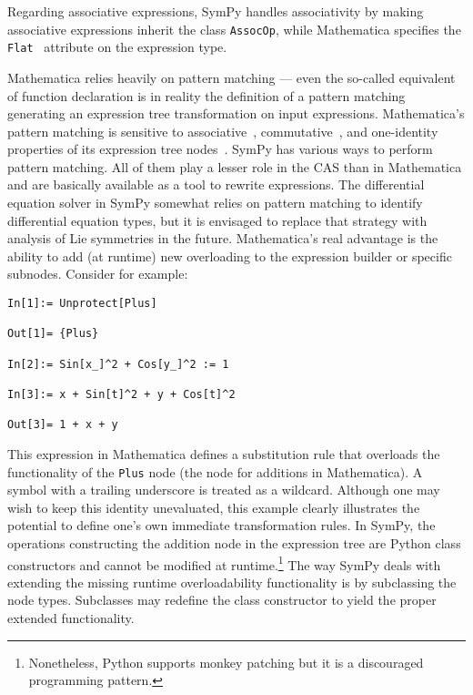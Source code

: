 
Regarding associative expressions,
SymPy handles associativity by making associative expressions inherit the
class \texttt{AssocOp},
while Mathematica specifies the \texttt{Flat}~\cite{WolframRefFlat} attribute on the expression type.




Mathematica relies heavily on pattern matching ---
even the so-called equivalent of function declaration is in reality
the definition of a pattern matching generating an expression tree transformation
on input expressions.
%
Mathematica's pattern matching is sensitive to
associative~\cite{WolframRefFlat}, commutative~\cite{WolframRefOrderless}, and
one-identity~\cite{WolframRefOneIdentity} properties of its expression tree
nodes~\cite{WolframRefFlatAndOrderlessFunctions}.
%
SymPy has various ways to perform pattern matching.
All of them play a lesser role in the CAS than in Mathematica
and are basically available as a tool to rewrite expressions.
The differential equation solver in SymPy somewhat relies on pattern matching to
identify differential equation types, but it is envisaged to replace
that strategy with analysis of Lie symmetries in the future.
Mathematica's real advantage is the ability to add (at runtime) new overloading
to the expression builder or specific subnodes.
Consider for example:
\begin{verbatim}
In[1]:= Unprotect[Plus]

Out[1]= {Plus}

In[2]:= Sin[x_]^2 + Cos[y_]^2 := 1

In[3]:= x + Sin[t]^2 + y + Cos[t]^2

Out[3]= 1 + x + y
\end{verbatim}
This expression in Mathematica defines a substitution rule that overloads
the functionality of the \texttt{Plus} node (the node for additions in Mathematica).
A symbol with a trailing underscore is treated as a wildcard.
Although one may wish to keep this identity unevaluated, this example clearly
illustrates the potential to define
one's own immediate transformation rules.
In SymPy, the operations constructing the addition node in the expression tree
are Python class constructors
and cannot be modified at runtime.\footnote{Nonetheless, Python supports monkey
patching but it is a discouraged programming pattern.}
The way SymPy deals with extending the missing runtime overloadability functionality
is by subclassing the node types.
Subclasses may redefine the class constructor to yield the proper
extended functionality.


